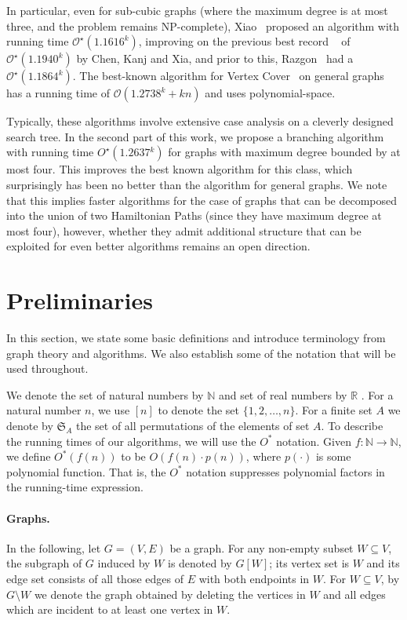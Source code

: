 \documentclass[svgnames]{llncs}
\newcommand{\NPC}{\textrm{\textup{NP-complete}}\xspace}
\newcommand{\OO}{{\mathcal O}}
\newcommand{\runtime}{\ensuremath{1.2637}}
\begin{document}
In particular, even for sub-cubic graphs (where the maximum degree is at most three, and the problem remains \NPC{}), Xiao~\cite{X10} proposed an
algorithm with running time $\OO^\star(1.1616^k)$, improving on the previous best record ~\cite{Chen:2005:LST:1108358.1108360} of $\OO^\star(1.1940^k)$ by Chen, Kanj and Xia, and prior
to this, Razgon~\cite{R09} had a $\OO^\star(1.1864^k)$. The best-known algorithm for Vertex Cover~\cite{CKX10} on general graphs has a running time of $\OO(1.2738^k + kn)$ and uses polynomial-space.


Typically, these algorithms involve extensive case analysis on a cleverly designed search tree. In the second part of this work, we propose a branching algorithm with running time $O^\star(\runtime{}^k)$ for graphs with maximum degree bounded by at most four. This improves the best known algorithm for this class, which surprisingly has been no better than the algorithm for general graphs. We note that this implies faster algorithms for the case of graphs that can be decomposed into the union of two Hamiltonian Paths (since they have maximum degree at most four), however, whether they admit additional structure that can be exploited for even better algorithms remains an open direction.





\section{Preliminaries}

In this section, we state some basic definitions and introduce terminology from graph theory and algorithms. We also establish some of the notation that will be used throughout. 

We denote the set of natural numbers by $\mathbb{N}$ and set of real numbers by $\mathbb{R}$ . 
For a natural number $n$, we use $[n]$ to denote the set $\{1,2,\ldots,n\}$. For a finite set $A$ we denote by \(\mathfrak{S}_A\) the set of all permutations of the elements of set \(A\). To describe the running times of our algorithms, we will use the $O^*$ notation. Given $f: \mathbb{N} \rightarrow \mathbb{N}$, we define $O^{*}(f(n))$ to be $O(f(n) \cdot p(n))$, where $p(\cdot)$ is some polynomial
function. That is, the $O^{*}$ notation suppresses polynomial
factors in the running-time expression. 



\paragraph{Graphs.} In the following, let $G=\left(V,E\right)$ be a graph. For any non-empty subset $W\subseteq V$, the subgraph of $G$ induced
by $W$ is denoted by $G[W]$; its vertex set is $W$ and its edge set consists of all those edges of $E$ with both endpoints in $W$.
For $W\subseteq V$, by $G\setminus W$ we denote the graph obtained by deleting the vertices in $W$ and all edges which are incident to at least one vertex in $W$.
\end{document}
